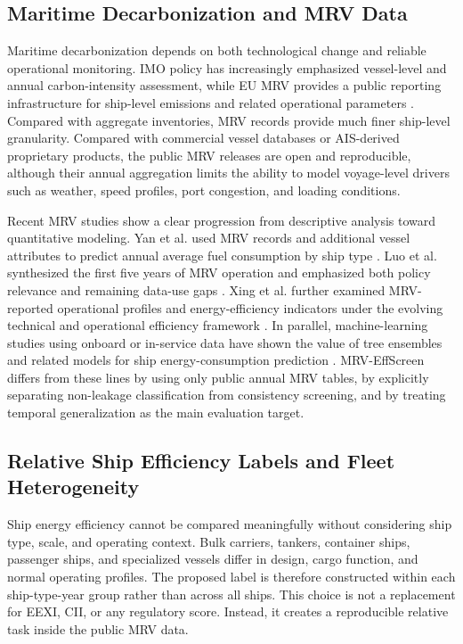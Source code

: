 \documentclass[preprints,article,submit,pdftex,oneauthor]{Definitions/mdpi}
\begin{document}
\subsection{Maritime Decarbonization and MRV Data}

Maritime decarbonization depends on both technological change and reliable operational monitoring. IMO policy has increasingly emphasized vessel-level and annual carbon-intensity assessment, while EU MRV provides a public reporting infrastructure for ship-level emissions and related operational parameters \cite{emsa_thetis_mrv,ec_2024_mrv_report,imo_2023_ghg_strategy,regulation_eu_2023_957}. Compared with aggregate inventories, MRV records provide much finer ship-level granularity. Compared with commercial vessel databases or AIS-derived proprietary products, the public MRV releases are open and reproducible, although their annual aggregation limits the ability to model voyage-level drivers such as weather, speed profiles, port congestion, and loading conditions.

Recent MRV studies show a clear progression from descriptive analysis toward quantitative modeling. Yan et al. used MRV records and additional vessel attributes to predict annual average fuel consumption by ship type \cite{yan2023mrv_energy_efficiency}. Luo et al. synthesized the first five years of MRV operation and emphasized both policy relevance and remaining data-use gaps \cite{luo2024mrv_review}. Xing et al. further examined MRV-reported operational profiles and energy-efficiency indicators under the evolving technical and operational efficiency framework \cite{xing2025mrv_efficiency_framework}. In parallel, machine-learning studies using onboard or in-service data have shown the value of tree ensembles and related models for ship energy-consumption prediction \cite{fan2024ship_energy_ml}. MRV-EffScreen differs from these lines by using only public annual MRV tables, by explicitly separating non-leakage classification from consistency screening, and by treating temporal generalization as the main evaluation target.

\subsection{Relative Ship Efficiency Labels and Fleet Heterogeneity}

Ship energy efficiency cannot be compared meaningfully without considering ship type, scale, and operating context. Bulk carriers, tankers, container ships, passenger ships, and specialized vessels differ in design, cargo function, and normal operating profiles. The proposed label is therefore constructed within each ship-type-year group rather than across all ships. This choice is not a replacement for EEXI, CII, or any regulatory score. Instead, it creates a reproducible relative task inside the public MRV data.
\end{document}
